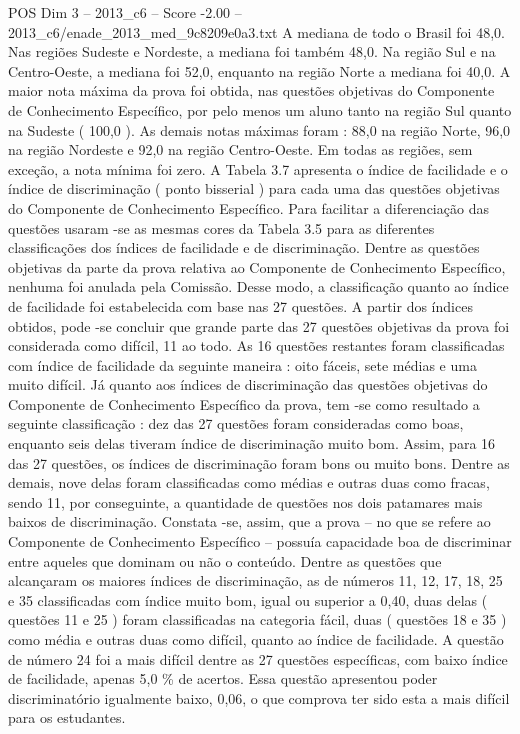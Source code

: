 \begin{textsample}{POS Dim 3 – 2013\_c6 – Score -2.00 – 2013\_c6/enade\_2013\_med\_9c8209e0a3.txt}
A mediana de todo o Brasil foi 48,0.
Nas regiões Sudeste e Nordeste, a mediana foi também 48,0.
Na região Sul e na Centro-Oeste, a mediana foi 52,0, enquanto na região Norte a mediana foi 40,0.
A maior nota máxima da prova foi obtida, nas questões objetivas do Componente de Conhecimento Específico, por pelo menos um aluno tanto na região Sul quanto na Sudeste ( 100,0 ).
As demais notas máximas foram : 88,0 na região Norte, 96,0 na região Nordeste e 92,0 na região Centro-Oeste.
Em todas as regiões, sem exceção, a nota mínima foi zero.
A Tabela 3.7 apresenta o índice de facilidade e o índice de discriminação ( ponto bisserial ) para cada uma das questões objetivas do Componente de Conhecimento Específico.
Para facilitar a diferenciação das questões usaram -se as mesmas cores da Tabela 3.5 para as diferentes classificações dos índices de facilidade e de discriminação.
Dentre as questões objetivas da parte da prova relativa ao Componente de Conhecimento Específico, nenhuma foi anulada pela Comissão.
Desse modo, a classificação quanto ao índice de facilidade foi estabelecida com base nas 27 questões.
A partir dos índices obtidos, pode -se concluir que grande parte das 27 questões objetivas da prova foi considerada como difícil, 11 ao todo.
As 16 questões restantes foram classificadas com índice de facilidade da seguinte maneira : oito fáceis, sete médias e uma muito difícil.
Já quanto aos índices de discriminação das questões objetivas do Componente de Conhecimento Específico da prova, tem -se como resultado a seguinte classificação : dez das 27 questões foram consideradas como boas, enquanto seis delas tiveram índice de discriminação muito bom.
Assim, para 16 das 27 questões, os índices de discriminação foram bons ou muito bons.
Dentre as demais, nove delas foram classificadas como médias e outras duas como fracas, sendo 11, por conseguinte, a quantidade de questões nos dois patamares mais baixos de discriminação.
Constata -se, assim, que a prova – no que se refere ao Componente de Conhecimento Específico – possuía capacidade boa de discriminar entre aqueles que dominam ou não o conteúdo.
Dentre as questões que alcançaram os maiores índices de discriminação, as de números 11, 12, 17, 18, 25 e 35 classificadas com índice muito bom, igual ou superior a 0,40, duas delas ( questões 11 e 25 ) foram classificadas na categoria fácil, duas ( questões 18 e 35 ) como média e outras duas como difícil, quanto ao índice de facilidade.
A questão de número 24 foi a mais difícil dentre as 27 questões específicas, com baixo índice de facilidade, apenas 5,0 \% de acertos.
Essa questão apresentou poder discriminatório igualmente baixo, 0,06, o que comprova ter sido esta a mais difícil para os estudantes.

\end{textsample}
